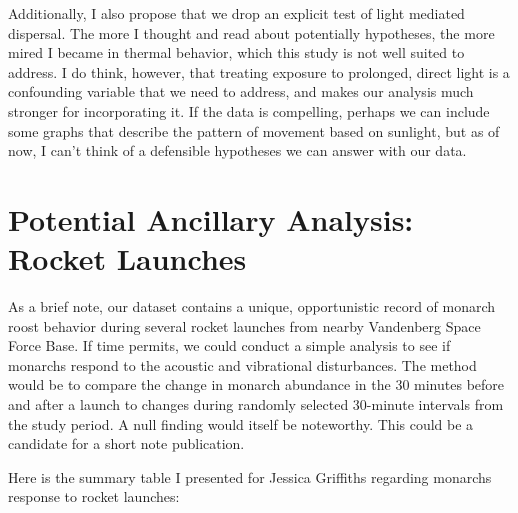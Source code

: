 Additionally, I also propose that we drop an explicit test of light mediated dispersal. The more I thought and read about potentially hypotheses, the more mired I became in thermal behavior, which this study is not well suited to address. I do think, however, that treating exposure to prolonged, direct light is a confounding variable that we need to address, and makes our analysis much stronger for incorporating it. If the data is compelling, perhaps we can include some graphs that describe the pattern of movement based on sunlight, but as of now, I can't think of a defensible hypotheses we can answer with our data. 

\section{Potential Ancillary Analysis: Rocket Launches}

As a brief note, our dataset contains a unique, opportunistic record of monarch roost behavior during several rocket launches from nearby Vandenberg Space Force Base. If time permits, we could conduct a simple analysis to see if monarchs respond to the acoustic and vibrational disturbances. The method would be to compare the change in monarch abundance in the 30 minutes before and after a launch to changes during randomly selected 30-minute intervals from the study period. A null finding would itself be noteworthy. This could be a candidate for a short note publication.

Here is the summary table I presented for Jessica Griffiths regarding monarchs response to rocket launches:

